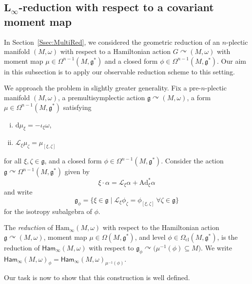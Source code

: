 \documentclass[pdftex]{sigma}
\numberwithin{equation}{section}
\DeclareMathOperator{\action}{\curvearrowright}
\newcommand{\g}{\mathfrak{g}}
\newcommand{\Ham}{\mathsf{Ham}}
\renewcommand{\L}{\mathscr{L}}
\newcommand{\Ad}{\mathrm{Ad}}
\renewcommand{\subset}{\subseteq}
\renewcommand{\d}{\mathrm{d}}
\begin{document}
\subsection[L\_infty-reduction with respect to a covariant moment map]{$\boldsymbol{L_\infty}$-reduction with respect to a covariant moment map}\label{Ssec:LinftyReductionMomentMap}

In Section~\ref{Ssec:MultiRed}, we considered the geometric reduction of an $n$-plectic manifold $(M,\omega)$ with respect to a Hamiltonian action $G\curvearrowright (M,\omega)$ with moment map $\mu\in\Omega^{n-1}(M,\g^*)$ and a closed form $\phi\in\Omega^{n-1}(M,\g^*)$. Our aim in this subsection is to apply our observable reduction scheme to this setting.

We approach the problem in slightly greater generality. Fix a pre-$n$-plectic manifold $(M,\omega)$, a premultisymplectic action $\g\curvearrowright(M,\omega)$, a form $\mu\in\Omega^{n-1}(M,\g^*)$ satisfying
\begin{enumerate}[i.]\itemsep=0pt
	\item[(i)] $\d\mu_\xi = -\iota_\xi\omega$,
	\item[(ii)] $\L_\xi\mu_\zeta = \mu_{[\xi,\zeta]}$
\end{enumerate}
for all $\xi,\zeta\in\g$, and a closed form $\phi\in\Omega^{n-1}(M,\g^*)$. Consider the action $\g\curvearrowright\Omega^{n-1}(M,\g^*)$ given by
\[
	\xi\cdot \alpha = \L_\xi\alpha + \Ad_\xi^*\alpha
\]
and write
\[
	\g_\phi = \bigl\{\xi\in\g \mid  \L_\xi\phi_\zeta = \phi_{[\xi,\zeta]} \ \forall\zeta\in\g\bigr\}
\]
for the isotropy subalgebra of $\phi$.

\begin{Definition}\label{def:observable_reduction_wrt_moment_map}
	The \emph{reduction} of $\mathrm{Ham}_\infty(M,\omega)$ with respect to the Hamiltonian action $\g\curvearrowright(M,\omega)$, moment map $\mu\in\Omega(M,\g^*)$, and level $\phi\in\Omega_{\mathrm{cl}}(M,\g^*)$, is the reduction of $\Ham_\infty(M,\omega)$ with respect to $\g_\phi\action\bigl(\mu^{-1}(\phi)\subset M\bigr)$. We write $\Ham_\infty(M,\omega)_\phi = \Ham_\infty(M,\omega)_{\mu^{-1}(\phi)}$.
\end{Definition}

Our task is now to show that this construction is well defined.
\end{document}

